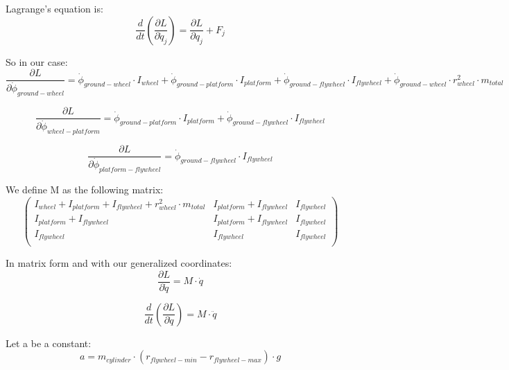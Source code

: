 Lagrange's equation is:
\begin{equation}
	\frac{d}{dt}(\frac{\partial L}{\partial \dot{q}_j})=
	\frac{\partial L}{\partial q_j}	+ F_{j}
\end{equation}

So in our case:
\begin{equation}
	\frac{\partial L}{\partial \dot{\phi}_{ground-wheel}}=
	\dot{\phi}_{ground-wheel} \cdot I_{wheel}
	+ \dot{\phi}_{ground-platform} \cdot I_{platform}
	+ \dot{\phi}_{ground-flywheel}\cdot I_{flywheel}
	+ \dot{\phi}_{ground-wheel}\cdot r_{wheel}^2\cdot m_{total}
\end{equation}

\begin{equation}
	\frac{\partial L}{\partial \dot{\phi}_{wheel-platform}}=
	\dot{\phi}_{ground-platform} \cdot I_{platform}
	+ \dot{\phi}_{ground-flywheel}\cdot I_{flywheel}
\end{equation}

\begin{equation}
	\frac{\partial L}{\partial \dot{\phi}_{platform-flywheel}}=
	\dot{\phi}_{ground-flywheel}\cdot I_{flywheel}
\end{equation}

We define M as the following matrix:
\begin{equation}
	\begin{pmatrix} 
		I_{wheel} + I_{platform} + I_{flywheel} + r_{wheel}^2 \cdot m_{total} &
		I_{platform} + I_{flywheel} &
		I_{flywheel}\\
		I_{platform} + I_{flywheel} &
		I_{platform} + I_{flywheel} &
		I_{flywheel}\\
		I_{flywheel} &
		I_{flywheel} &
		I_{flywheel}\\
		\end{pmatrix}
\end{equation}

In matrix form and with our generalized coordinates:
\begin{equation}
	\frac{\partial L}{\partial \dot{q}} =
	M \cdot \dot{q}
\end{equation}

\begin{equation}
	\frac{d}{dt}(\frac{\partial L}{\partial \dot{q}}) = 	M \cdot \ddot{q}	
\end{equation}

Let a be a constant:
\begin{equation}
	a = m_{cylinder}\cdot (r_{flywheel-min}-r_{flywheel-max}) \cdot g	
\end{equation}

